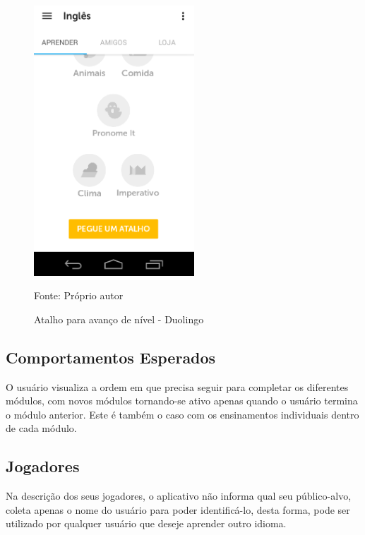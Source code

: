 \documentclass[
	12pt,				%
	openany,			%
	oneside,			%
	a4paper,			%
	english,			%
	french,				%
	spanish,			%
	brazil				%
	]{abntex2}
\begin{document}
\begin{figure}[H]
    \centering
\caption{Atalho para avanço de nível - Duolingo}
\includegraphics[width=6cm]{figuras/atalhoduolingo.png}
\par
 Fonte: Próprio autor
\end{figure}

\subsection{Comportamentos Esperados}
	O usuário visualiza a ordem em que precisa seguir para completar os diferentes módulos, com novos módulos tornando-se ativo apenas quando o usuário termina o módulo anterior. Este é também o caso com os ensinamentos individuais dentro de cada módulo.

\subsection{Jogadores}

Na descrição dos seus jogadores, o aplicativo não informa qual seu público-alvo, coleta apenas o nome do usuário para poder identificá-lo, desta forma, pode ser utilizado por qualquer usuário que deseje aprender outro idioma.
\end{document}
